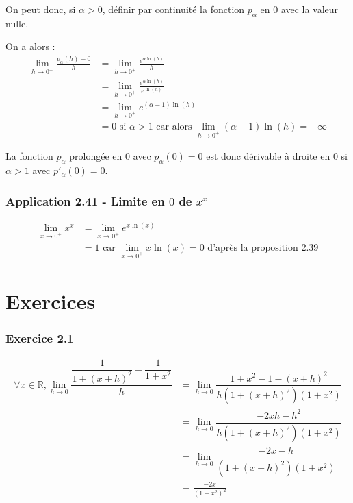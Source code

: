 \documentclass[a4paper,10pt]{report}
\begin{document}
On peut donc, si $\alpha > 0$, définir par continuité la fonction $p_{\alpha}$ en $0$ avec la valeur nulle.

On a alors :
\begin{equation*}
	\begin{split}
		\lim_{h\rightarrow 0^{+}} \frac{p_{\alpha}(h) - 0}{h}
		&= \lim_{h\rightarrow 0^{+}} \frac{e^{\alpha \ln(h)}}{h} \\
		&= \lim_{h\rightarrow 0^{+}} \frac{e^{\alpha \ln(h)}}{e^{\ln(h)}} \\
		&= \lim_{h\rightarrow 0^{+}} e^{(\alpha-1) \ln(h)} \\
		&=0 \text{ si $\alpha >1$ car alors $\lim_{h\rightarrow 0^{+}} (\alpha-1) \ln(h) = -\infty$}
	\end{split}
\end{equation*}

La fonction $p_{\alpha}$ prolongée en $0$ avec $p_{\alpha}(0)=0$ est donc dérivable à droite en $0$ si $\alpha>1$
avec $p'_{\alpha}(0)=0$.


\subsection*{Application 2.41 - Limite en $0$ de $x^x$}

\begin{equation*}
	\begin{split}
		\lim_{x\rightarrow 0^{+}} x^x
		&= \lim_{x\rightarrow 0^{+}} e^{x\ln(x)} \\
	    &= 1 \text{ car  $\lim_{x\rightarrow 0^{+}} x\ln(x) = 0$ d'après la proposition 2.39}
	\end{split}
\end{equation*}

\chapter*{Exercices}

\subsection*{Exercice 2.1}

\begin{equation*}
	\begin{split}
		\forall x \in \mathbb{R}, \lim_{h\rightarrow 0} \dfrac{\dfrac{1}{1+(x+h)^2}-\dfrac{1}{1+x^2}}{h}
		&= \lim_{h\rightarrow 0} \dfrac{1+x^2-1-(x+h)^2}{h(1+(x+h)^2)(1+x^2)} \\
		&= \lim_{h\rightarrow 0} \dfrac{-2xh-h^2}{h(1+(x+h)^2)(1+x^2)} \\
		&= \lim_{h\rightarrow 0} \dfrac{-2x-h}{(1+(x+h)^2)(1+x^2)} \\
		&= \frac{-2x}{(1+x^2)^2} \\
	\end{split}
\end{equation*}
\end{document}
